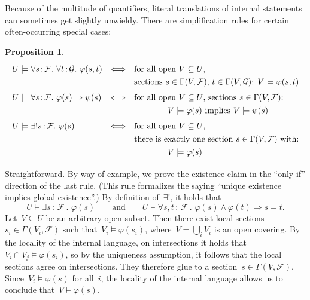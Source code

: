 \documentclass[10pt,reqno,a4paper]{amsbook}
\makeatletter
\theoremstyle{definition}
\theoremstyle{plain}
\newtheorem{prop}[defn]{Proposition}
\theoremstyle{remark}
\newcommand{\F}{\mathcal{F}}
\renewcommand{\G}{\mathcal{G}}
\newcommand{\?}{\,{:}\,}
\renewcommand{\_}{\mathpunct{.}\,}
\renewenvironment{proof}[1][\proofname]{\par
  \pushQED{\qed}%
  \normalfont \topsep6\p@\@plus6\p@\relax
  \trivlist
  \item[\hskip\labelsep
        \itshape
    #1\@addpunct{.}]\ignorespaces
}{%
  \popQED\endtrivlist\@endpefalse
}
\makeatother
\begin{document}
Because of the multitude of quantifiers, literal translations of internal statements
can sometimes get slightly unwieldy. There are simplification rules for certain
often-occurring special cases:
\begin{prop}\label{prop:simplification}
    \[ \renewcommand{\arraystretch}{1.3}\begin{array}{@{}lcl@{}}
      U \models \forall s\?\F\_ \forall t\?\G\_ \varphi(s,t)
      &\Longleftrightarrow&
      \text{for all open~$V \subseteq U$,} \\
      && \text{sections~$s \in \Gamma(V,\F)$, $t \in \Gamma(V,\G)$:
      $V \models \varphi(s,t)$} \\[0.3em]
      U \models \forall s\?\F\_ \varphi(s) \Rightarrow \psi(s)
      &\Longleftrightarrow&
      \text{for all open~$V \subseteq U$, sections~$s \in \Gamma(V,\F)$:} \\
      &&\qquad\qquad \text{$V \models \varphi(s)$ implies $V \models \psi(s)$}
      \\[0.3em]
      U \models \exists!s\?\F\_ \varphi(s)
      &\Longleftrightarrow&
      \text{for all open~$V \subseteq U$,} \\
      &&
      \text{there is exactly one section~$s \in \Gamma(V,\F)$ with:} \\
      &&\qquad\qquad V \models \varphi(s)
    \end{array} \]
\end{prop}
\begin{proof}Straightforward. By way of example, we prove the existence claim
in the ``only if'' direction of the last rule. (This rule formalizes
the saying ``unique existence implies global existence''.) By definition of~$\exists!$, it
holds that
\[ U \models \exists s\?\F\_ \varphi(s)
  \qquad\text{and}\qquad
  U \models \forall s,t\?\F\_ \varphi(s) \wedge \varphi(t) \Rightarrow s = t. \]
Let~$V \subseteq U$ be an arbitrary open subset. Then there exist local
sections~$s_i \in \Gamma(V_i,\F)$ such that~$V_i \models \varphi(s_i)$, where~$V
= \bigcup_i V_i$ is an open covering. By the locality of the internal language,
on intersections it holds that~$V_i \cap V_j \models \varphi(s_i)$, so by the
uniqueness assumption, it follows that the local sections agree on intersections.
They therefore glue to a section~$s \in \Gamma(V,\F)$. Since~$V_i \models
\varphi(s)$ for all~$i$, the locality of the internal language allows us to
conclude that~$V \models \varphi(s)$.
\end{proof}
\end{document}
